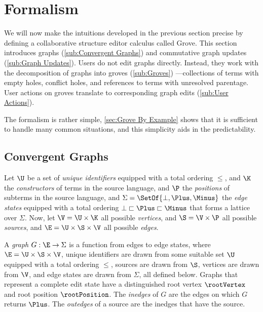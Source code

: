 
\section{Formalism}%
\label{sec:Formalism}


We will now make the intuitions developed in the previous section precise by defining a collaborative structure editor calculus called Grove.
This section introduces
  graphs (\autoref{sub:Convergent Graphs})
  and commutative graph updates (\autoref{sub:Graph Updates}).
Users do not edit graphs directly.
Instead, they work with the decomposition of graphs into groves (\autoref{sub:Groves})%
---collections of terms with empty holes, conflict holes, and references to terms with unresolved parentage.
User actions on groves translate to corresponding graph edits (\autoref{sub:User Actions}). 




The formalism is rather simple, \autoref{sec:Grove By Example} shows
that it is sufficient to handle many common situations,
and this simplicity aids in the predictability.

\figureArity

\subsection{Convergent Graphs}%
\label{sub:Convergent Graphs}

Let $\U$ be a set of \emph{unique identifiers} equipped with a total ordering $\leq$,
and $\K$ the \emph{constructors} of terms in the source language,
and $\P$ the \emph{positions} of subterms in the source language,
and $\Sigma = \SetOf{\bot, \Plus, \Minus}$ the
  \emph{edge states} equipped with a total ordering $\bot \sqsubset \Plus \sqsubset \Minus$ that forms a lattice over $\Sigma$.
Now, let $\V = \U \times \K$ all possible \emph{vertices},
and $\S = \V \times \P$ all possible \emph{sources},
and $\E = \U \times \S \times \V$ all possible \emph{edges}.

A \emph{graph} $G : \E \rightarrow \Sigma$ is a function from edges to edge states,
  where $\E = \U \times \S \times \V$,
  unique identifiers are drawn from some suitable set $\U$ equipped with a total ordering $\leq$,
  sources are drawn from $\S$,
  vertices are drawn from $\V$,
  and edge states are drawn from $\Sigma$,
  all defined below.
Graphs that represent a complete edit state have a distinguished
  root vertex $\rootVertex$
  and root position $\rootPosition$.
The \emph{inedges} of $G$ are the edges on which $G$ returns $\Plus$.
The \emph{outedges} of a source are the inedges that have the source.

